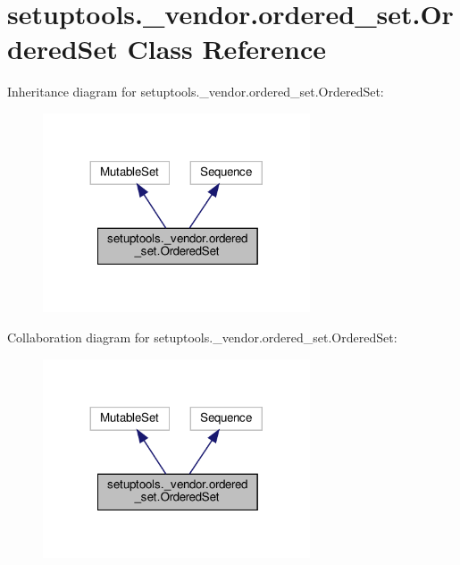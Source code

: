 \hypertarget{classsetuptools_1_1__vendor_1_1ordered__set_1_1OrderedSet}{}\section{setuptools.\+\_\+vendor.\+ordered\+\_\+set.\+Ordered\+Set Class Reference}
\label{classsetuptools_1_1__vendor_1_1ordered__set_1_1OrderedSet}


Inheritance diagram for setuptools.\+\_\+vendor.\+ordered\+\_\+set.\+Ordered\+Set\+:
\nopagebreak
\begin{figure}[H]
\begin{center}
\leavevmode
\includegraphics[width=224pt]{classsetuptools_1_1__vendor_1_1ordered__set_1_1OrderedSet__inherit__graph}
\end{center}
\end{figure}


Collaboration diagram for setuptools.\+\_\+vendor.\+ordered\+\_\+set.\+Ordered\+Set\+:
\nopagebreak
\begin{figure}[H]
\begin{center}
\leavevmode
\includegraphics[width=224pt]{classsetuptools_1_1__vendor_1_1ordered__set_1_1OrderedSet__coll__graph}
\end{center}
\end{figure}
